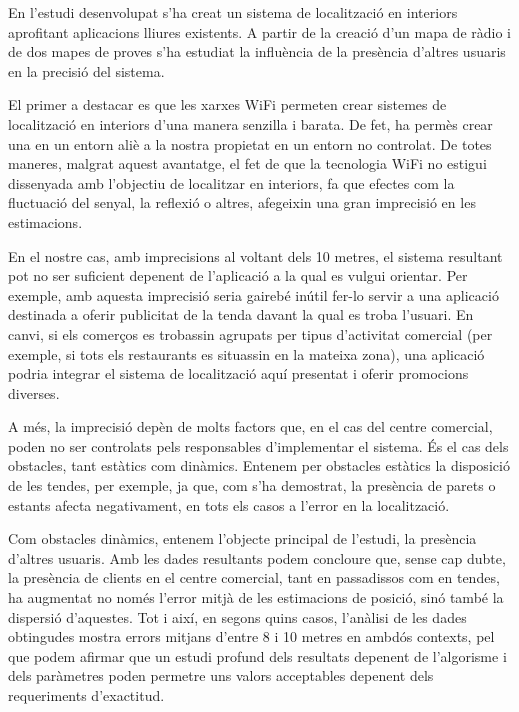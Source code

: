 
En l'estudi desenvolupat s'ha creat un sistema de localització en interiors aprofitant aplicacions lliures existents. A partir de la creació d'un mapa de ràdio i de dos mapes de proves s'ha estudiat la influència de la presència d'altres usuaris en la precisió del sistema.

El primer a destacar es que les xarxes WiFi permeten crear sistemes de localització en interiors d'una manera senzilla i barata. De fet, ha permès crear una en un entorn aliè a la nostra propietat en un entorn no controlat. De totes maneres, malgrat aquest avantatge, el fet de que la tecnologia WiFi no estigui dissenyada amb l'objectiu de localitzar en interiors, fa que efectes com la fluctuació del senyal, la reflexió o altres, afegeixin una gran imprecisió en les estimacions.

En el nostre cas, amb imprecisions al voltant dels 10 metres, el sistema resultant pot no ser suficient depenent de l'aplicació a la qual es vulgui orientar. Per exemple, amb aquesta imprecisió seria gairebé inútil fer-lo servir a una aplicació destinada a oferir publicitat de la tenda davant la qual es troba l'usuari. En canvi, si els comerços es trobassin agrupats per tipus d'activitat comercial (per exemple, si tots els restaurants es situassin en la mateixa zona), una aplicació podria integrar el sistema de localització aquí presentat i oferir promocions diverses.

A més, la imprecisió depèn de molts factors que, en el cas del centre comercial, poden no ser controlats pels responsables d'implementar el sistema. És el cas dels obstacles, tant estàtics com dinàmics. Entenem per obstacles estàtics la disposició de les tendes, per exemple, ja que, com s'ha demostrat, la presència de parets o estants afecta negativament, en tots els casos a l'error en la localització.

Com obstacles dinàmics, entenem l'objecte principal de l'estudi, la presència d'altres usuaris. Amb les dades resultants podem concloure que, sense cap dubte, la presència de clients en el centre comercial, tant en passadissos com en tendes, ha augmentat no només l'error mitjà de les estimacions de posició, sinó també la dispersió d'aquestes. Tot i així, en segons quins casos, l'anàlisi de les dades obtingudes mostra errors mitjans d'entre 8 i 10 metres en ambdós contexts, pel que podem afirmar que un estudi profund dels resultats depenent de l'algorisme i dels paràmetres poden permetre uns valors acceptables depenent dels requeriments d'exactitud.
